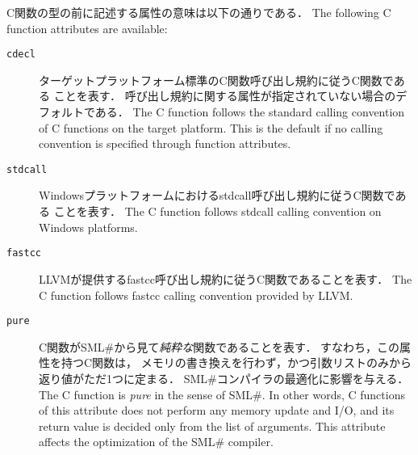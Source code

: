 \documentclass{jbook}
\newcommand{\smlsharp}{SML\#}
\begin{document}
\ifjp%
	C関数の型の前に記述する属性の意味は以下の通りである．
\else%
	The following C function attributes are available:
\fi%
\begin{description}
\item[{\tt cdecl}]
\ifjp%
	ターゲットプラットフォーム標準のC関数呼び出し規約に従うC関数である
ことを表す．
	呼び出し規約に関する属性が指定されていない場合のデフォルトである．
\else%
	The C function follows the standard calling convention of C
functions on the target platform.
	This is the default if no calling convention is specified
through function attributes.
\fi%
\item[{\tt stdcall}]
\ifjp%
	Windowsプラットフォームにおけるstdcall呼び出し規約に従うC関数である
ことを表す．
\else%
	The C function follows stdcall calling convention on
Windows platforms.
\fi%
\item[{\tt fastcc}]
\ifjp%
	LLVMが提供するfastcc呼び出し規約に従うC関数であることを表す．
\else%
	The C function follows fastcc calling convention provided
by LLVM.
\fi%
\item[{\tt pure}]
\ifjp%
	C関数が\smlsharp{}から見て{\em 純粋な}関数であることを表す．
	すなわち，この属性を持つC関数は，
メモリの書き換えを行わず，かつ引数リストのみから返り値がただ1つに定まる．
	\smlsharp{}コンパイラの最適化に影響を与える．
\else%
	The C function is {\em pure\/} in the sense of \smlsharp{}.
	In other words,
C functions of this attribute does not perform
any memory update and I/O,
and its return value is decided only from the list of arguments.
	This attribute affects the optimization of
the \smlsharp{} compiler.
\fi%

\end{description}
\end{document}
